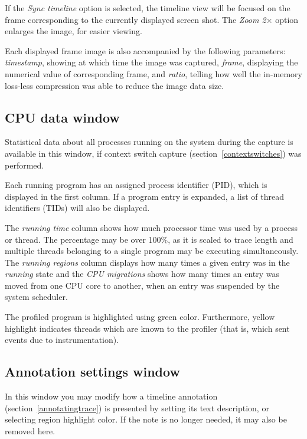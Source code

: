 \documentclass[hidelinks,titlepage,a4paper]{article}
\begin{document}
If the \emph{Sync timeline} option is selected, the timeline view will be focused on the frame corresponding to the currently displayed screen shot. The \emph{Zoom 2$\times$} option enlarges the image, for easier viewing.

Each displayed frame image is also accompanied by the following parameters: \emph{timestamp}, showing at which time the image was captured, \emph{frame}, displaying the numerical value of corresponding frame, and \emph{ratio}, telling how well the in-memory loss-less compression was able to reduce the image data size.

\subsection{CPU data window}
\label{cpudata}

Statistical data about all processes running on the system during the capture is available in this window, if context switch capture (section~\ref{contextswitches}) was performed.

Each running program has an assigned process identifier (PID), which is displayed in the first column. If a program entry is expanded, a list of thread identifiers (TIDs) will also be displayed.

The \emph{running time} column shows how much processor time was used by a process or thread. The percentage may be over 100\%, as it is scaled to trace length and multiple threads belonging to a single program may be executing simultaneously. The \emph{running regions} column displays how many times a given entry was in the \emph{running} state and the \emph{CPU migrations} shows how many times an entry was moved from one CPU core to another, when an entry was suspended by the system scheduler.

The profiled program is highlighted using green color. Furthermore, yellow highlight indicates threads which are known to the profiler (that is, which sent events due to instrumentation).

\subsection{Annotation settings window}
\label{annotationsettings}

In this window you may modify how a timeline annotation (section~\ref{annotatingtrace}) is presented by setting its text description, or selecting region highlight color. If the note is no longer needed, it may also be removed here.
\end{document}
